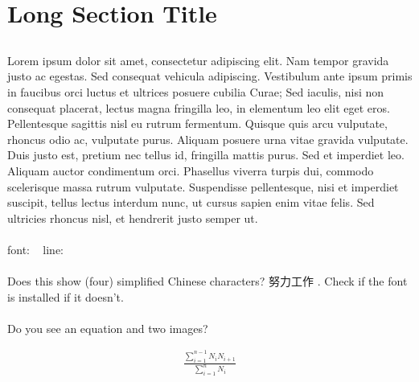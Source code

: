 \documentclass[a4paper,twoside,UTF8]{article}
\begin{document}
	\section[Short Section Title]{Long Section Title}
		\begin{multicols}{2}
		\subsection{}
			\paragraph{}
				Lorem ipsum dolor sit amet, consectetur adipiscing elit. Nam tempor gravida justo ac egestas. Sed consequat vehicula adipiscing. Vestibulum ante ipsum primis in faucibus orci luctus et ultrices posuere cubilia Curae; Sed iaculis, nisi non consequat placerat, lectus magna fringilla leo, in elementum leo elit eget eros. Pellentesque sagittis nisl eu rutrum fermentum. Quisque quis arcu vulputate, rhoncus odio ac, vulputate purus. Aliquam posuere urna vitae gravida vulputate. Duis justo est, pretium nec tellus id, fringilla mattis purus. Sed et imperdiet leo. Aliquam auctor condimentum orci. Phasellus viverra turpis dui, commodo scelerisque massa rutrum vulputate. Suspendisse pellentesque, nisi et imperdiet suscipit, tellus lectus interdum nunc, ut cursus sapien enim vitae felis. Sed ultricies rhoncus nisl, et hendrerit justo semper ut.
			\paragraph{}
				font: \fontname\font\ \the\fontdimen6\font
				line: \prntlen{\textwidth} \prntlen{\linewidth}
			\paragraph{}
				Does this show (four) simplified Chinese characters? 努力工作 . Check if the font is installed if it doesn't.
			\paragraph{}
				Do you see an equation and two images?
		\end{multicols}

		\begin{equation} \begin{split}
			\frac{\sum_{i=1}^{n-1}N_{i}N_{i+1}}{\sum_{i=1}^{n} N_{i}}
			\label{eq:equation_label}
		\end{split} \end{equation}
\end{document}
